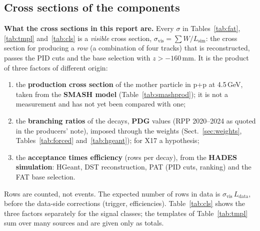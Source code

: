 \documentclass[11pt,a4paper]{article}
\newcommand{\Lsim}{\ensuremath{L_{\mathrm{sim}}}\xspace}
\newcommand{\Ldata}{\ensuremath{L_{\mathrm{data}}}\xspace}
\begin{document}
\subsection{Cross sections of the components}
\label{sec:xsec}
\textbf{What the cross sections in this report are.} Every $\sigma$ in Tables~\ref{tab:fat},
\ref{tab:tmpl} and~\ref{tab:cls} is a \emph{visible} cross section,
$\sigma_{\mathrm{vis}} = \sum W/\Lsim$: the cross section for producing a \emph{row} (a combination
of four tracks) that is reconstructed, passes the PID cuts and the base selection with
$z>-160$\,mm. It is the product of three factors of different origin:
\begin{enumerate}
\item the \textbf{production cross section} of the mother particle in p+p at 4.5\,GeV, taken from
      the \textbf{SMASH model} (Table~\ref{tab:smashprod}); it is not a measurement and has not yet
      been compared with one;
\item the \textbf{branching ratios} of the decays, \textbf{PDG} values (RPP 2020--2024 as quoted in the
      producers' note), imposed through the weights (Sect.~\ref{sec:weights},
      Tables~\ref{tab:forced} and~\ref{tab:hgeant}); for X17 a hypothesis;
\item the \textbf{acceptance times efficiency} (rows per decay), from the \textbf{HADES simulation}:
      HGeant, DST reconstruction, PAT (PID cuts, ranking) and the FAT base selection.
\end{enumerate}
Rows are counted, not events. The expected number of rows in data is $\sigma_{\mathrm{vis}}\,\Ldata$,
before the data-side corrections (trigger, efficiencies). Table~\ref{tab:cls} shows the three
factors separately for the signal classes; the templates of Table~\ref{tab:tmpl} sum over many
sources and are given only as totals.
\end{document}
